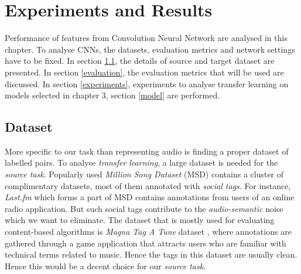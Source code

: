 

\chapter{Experiments and Results} %

\label{Chapter4} %

Performance of features from Convolution Neural Network are analysed in this chapter. To analyse CNNs, the datasets, evaluation metrics and network settings have to be fixed. In section \ref{dataset}, the details of source and target dataset are presented. In section \ref{evaluation}, the evaluation metrics that will be used are discussed. In section \ref{experiments}, experiments to analyse transfer learning on models selected in chapter 3, section \ref{model} are performed.

\section{Dataset}
\label{dataset}
More specific to our task than representing audio is finding a proper dataset of labelled pairs. To analyse \textit{transfer learning}, a large dataset is needed for the \textit{source task}. Popularly used \textit{Million Song Dataset} (MSD) \cite{MSD} contains a cluster of complimentary datasets, most of them annotated with \textit{social tags}. For instance, \textit{Last.fm} which forms a part of MSD contains annotations from users of an online radio application. But such social tags contribute to the \textit{audio-semantic} noise which we want to eliminate. The dataset that is mostly used for evaluating content-based algorithms is \textit{Magna Tag A Tune} dataset \cite{MTT}, where annotations are gathered through a game application that attracts users who are familiar with technical terms related to music. Hence the tags in this dataset are usually clean. Hence this would be a decent choice for our \textit{source task}.

